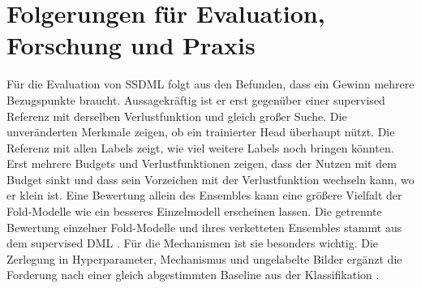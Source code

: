\section{Folgerungen für Evaluation, Forschung und Praxis}
\label{sec:d:folgerungen}

Für die Evaluation von \ac{SSDML} folgt aus den Befunden, dass ein Gewinn mehrere Bezugspunkte braucht. Aussagekräftig ist er erst gegenüber einer supervised Referenz mit derselben Verlustfunktion und gleich großer Suche. Die unveränderten Merkmale zeigen, ob ein trainierter Head überhaupt nützt. Die Referenz mit allen Labels zeigt, wie viel weitere Labels noch bringen könnten. Erst mehrere Budgets und Verlustfunktionen zeigen, dass der Nutzen mit dem Budget sinkt und dass sein Vorzeichen mit der Verlustfunktion wechseln kann, wo er klein ist. Eine Bewertung allein des Ensembles kann eine größere Vielfalt der Fold-Modelle wie ein besseres Einzelmodell erscheinen lassen. Die getrennte Bewertung einzelner Fold-Modelle und ihres verketteten Ensembles stammt aus dem supervised \ac{DML} \cite{musgrave_metric_2020}. Für die Mechanismen ist sie besonders wichtig. Die Zerlegung in Hyperparameter, Mechanismus und ungelabelte Bilder ergänzt die Forderung nach einer gleich abgestimmten Baseline aus der Klassifikation \cite{oliver_realistic_2018}. 

